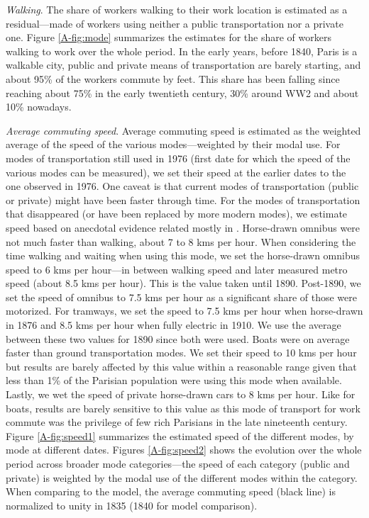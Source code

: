 \documentclass[11pt]{report}
\begin{document}
\noindent\textit{Walking}. The share of workers walking to their work location is estimated as a residual---made of workers using neither a public transportation nor a private one. Figure \ref{A-fig:mode} summarizes the estimates for the share of workers walking to work over the whole period. In the early years, before 1840, Paris is a walkable city, public and private means of transportation are barely starting, and about 95\% of the workers commute by feet. This share has been falling since reaching about 75\% in the early twentieth century, 30\% around WW2 and about 10\% nowadays.



\noindent\textit{Average commuting speed}. Average commuting speed is estimated as the weighted average of the speed of the various modes---weighted by their modal use. For modes of transportation still used in 1976 (first date for which the speed of the various modes can be measured), we set their speed at the earlier dates to the one observed in 1976. One caveat is that current modes of transportation (public or private) might have been faster through time. For the modes of transportation that disappeared (or have been replaced by more modern modes), we estimate speed based on anecdotal evidence related mostly in \cite{martin1894etude}. Horse-drawn omnibus were not much faster than walking, about 7 to 8 kms per hour. When considering the time walking and waiting when using this mode, we set the horse-drawn omnibus speed to 6 kms per hour---in between walking speed and later measured metro speed (about 8.5 kms per hour). This is the value taken until 1890. Post-1890, we set the speed of omnibus to 7.5 kms per hour as a significant share of those were motorized. For tramways, we set the speed to 7.5 kms per hour when horse-drawn in 1876 and 8.5 kms per hour when fully electric in 1910. We use the average between these two values for 1890 since both were used. Boats were on average faster than ground transportation modes. We set their speed to 10 kms per hour but results are barely affected by this value within a reasonable range given that less than 1\% of the Parisian population were using this mode when available. Lastly, we wet the speed of private horse-drawn cars to 8 kms per hour. Like for boats, results are barely sensitive to this value as this mode of transport for work commute was the privilege of few rich Parisians in the late nineteenth century. Figure \ref{A-fig:speed1} summarizes the estimated speed of the different modes, by mode at different dates. Figures \ref{A-fig:speed2} shows the evolution over the whole period across broader mode categories---the speed of each category (public and private) is weighted by the modal use of the different modes within the category. When comparing to the model, the average commuting speed (black line) is normalized to unity in 1835 (1840 for model comparison).
\end{document}

